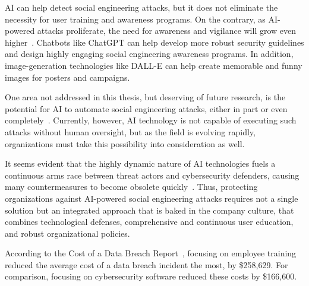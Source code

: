 AI can help detect social engineering attacks, but it does not eliminate the necessity for user training and awareness programs. On the contrary, as AI-powered attacks proliferate, the need for awareness and vigilance will grow even higher~\citep{fakhouri_AI_Driven_Solutions_SE_Attacks_2024}. Chatbots like ChatGPT can help develop more robust security guidelines and design highly engaging social engineering awareness programs. In addition, image-generation technologies like DALL-E can help create memorable and funny images for posters and campaigns.

One area not addressed in this thesis, but deserving of future research, is the potential for AI to automate social engineering attacks, either in part or even completely~\citep{mirsky_Threat_Offensive_AI_Organizations_2023}. Currently, however, AI technology is not capable of executing such attacks without human oversight, but as the field is evolving rapidly, organizations must take this possibility into consideration as well.





It seems evident that the highly dynamic nature of AI technologies fuels a continuous arms race between threat actors and cybersecurity defenders, causing many countermeasures to become obsolete quickly~\citep{fakhouri_AI_Driven_Solutions_SE_Attacks_2024}. Thus, protecting organizations against AI-powered social engineering attacks requires not a single solution but an integrated approach that is baked in the company culture, that combines technological defenses, comprehensive and continuous user education, and robust organizational policies.


According to the Cost of a Data Breach Report~\citep{ibm_Cost_Data_Breach_Report_2024}, focusing on employee training reduced the average cost of a data breach incident the most, by \$258,629. For comparison, focusing on cybersecurity software reduced these costs by \$166,600.

